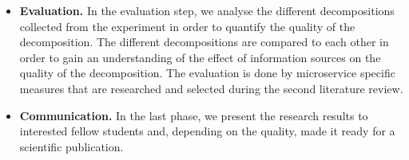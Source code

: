 \begin{itemize}
    
    \item \textbf{Evaluation.} In the evaluation step, we analyse the different decompositions collected from the experiment in order to quantify the quality of the decomposition. The different decompositions are compared to each other in order to gain an understanding of the effect of information sources on the quality of the decomposition. The evaluation is done by microservice specific measures that are researched and selected during the second literature review. 
    \item \textbf{Communication.} In the last phase, we present the research results to interested fellow students and, depending on the quality, made it ready for a scientific publication.
\end{itemize}
